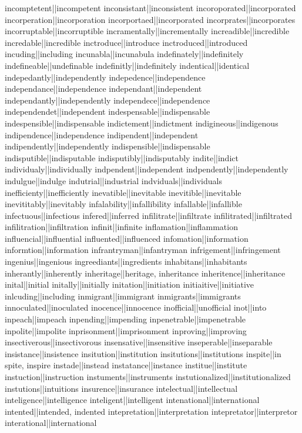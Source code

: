 incomptetent||incompetent
inconsistant||inconsistent
incoroporated||incorporated
incorperation||incorporation
incorportaed||incorporated
incorprates||incorporates
incorruptable||incorruptible
incramentally||incrementally
increadible||incredible
incredable||incredible
inctroduce||introduce
inctroduced||introduced
incuding||including
incunabla||incunabula
indefinately||indefinitely
indefineable||undefinable
indefinitly||indefinitely
indentical||identical
indepedantly||independently
indepedence||independence
independance||independence
independant||independent
independantly||independently
independece||independence
independendet||independent
indespensable||indispensable
indespensible||indispensable
indictement||indictment
indigineous||indigenous
indipendence||independence
indipendent||independent
indipendently||independently
indispensible||indispensable
indisputible||indisputable
indisputibly||indisputably
indite||indict
individualy||individually
indpendent||independent
indpendently||independently
indulgue||indulge
indutrial||industrial
indviduals||individuals
inefficienty||inefficiently
inevatible||inevitable
inevitible||inevitable
inevititably||inevitably
infalability||infallibility
infallable||infallible
infectuous||infectious
infered||inferred
infilitrate||infiltrate
infilitrated||infiltrated
infilitration||infiltration
infinit||infinite
inflamation||inflammation
influencial||influential
influented||influenced
infomation||information
informtion||information
infrantryman||infantryman
infrigement||infringement
ingenius||ingenious
ingreediants||ingredients
inhabitans||inhabitants
inherantly||inherently
inheritage||heritage, inheritance
inheritence||inheritance
inital||initial
initally||initially
initation||initiation
initiaitive||initiative
inlcuding||including
inmigrant||immigrant
inmigrants||immigrants
innoculated||inoculated
inocence||innocence
inofficial||unofficial
inot||into
inpeach||impeach
inpending||impending
inpenetrable||impenetrable
inpolite||impolite
inprisonment||imprisonment
inproving||improving
insectiverous||insectivorous
insensative||insensitive
inseperable||inseparable
insistance||insistence
insitution||institution
insitutions||institutions
inspite||in spite, inspire
instade||instead
instatance||instance
institue||institute
instuction||instruction
instuments||instruments
instutionalized||institutionalized
instutions||intuitions
insurence||insurance
intelectual||intellectual
inteligence||intelligence
inteligent||intelligent
intenational||international
intented||intended, indented
intepretation||interpretation
intepretator||interpretor
interational||international
